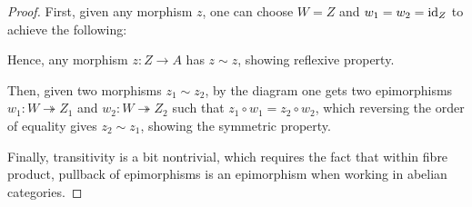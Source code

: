 \documentclass{article}
\begin{document}
\begin{proof}
    First, given any morphism $z$, one can choose $W = Z$ and $w_1=w_2=\mathrm{id}_Z$ to achieve the following:
    \begin{center}
    \end{center}
    Hence, any morphism $z:Z\rightarrow A$ has $z\sim z$, showing reflexive property.

    \hfil

    Then, given two morphisms $z_1\sim z_2$, by the diagram one gets two epimorphisms $w_1:W\twoheadrightarrow Z_1$ and $w_2:W\twoheadrightarrow Z_2$ such that $z_1 \circ w_1=z_2\circ w_2$, which reversing the order of equality gives $z_2\sim z_1$, showing the symmetric property.

    \hfil

    Finally, transitivity is a bit nontrivial, which requires the fact that within fibre product, pullback of epimorphisms is an epimorphism when working in abelian categories.


\end{proof}
\end{document}
